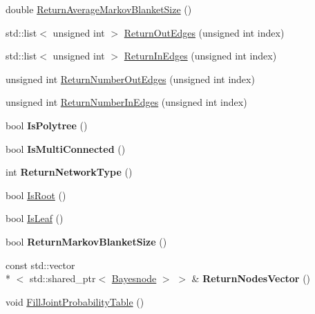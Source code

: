 \begin{DoxyCompactItemize}
\item 
double \hyperlink{classbayonet_1_1_bayesnet_aff74bb04d80a706595705bfa7b58758c}{Return\-Average\-Markov\-Blanket\-Size} ()
\item 
std\-::list$<$ unsigned int $>$ \hyperlink{classbayonet_1_1_bayesnet_acb33076271f03ba59ac98a04b762d26b}{Return\-Out\-Edges} (unsigned int index)
\item 
std\-::list$<$ unsigned int $>$ \hyperlink{classbayonet_1_1_bayesnet_a5621b949d8fda17ae0efd9810655b1b3}{Return\-In\-Edges} (unsigned int index)
\item 
unsigned int \hyperlink{classbayonet_1_1_bayesnet_aae9de07f181dc75f309b7f59e302a947}{Return\-Number\-Out\-Edges} (unsigned int index)
\item 
unsigned int \hyperlink{classbayonet_1_1_bayesnet_a7d47ce38f3882b80121f6acc351fd373}{Return\-Number\-In\-Edges} (unsigned int index)
\item 
\hypertarget{classbayonet_1_1_bayesnet_adb81cc447fe07fab5652c7a6b2fe9375}{bool {\bfseries Is\-Polytree} ()}\label{classbayonet_1_1_bayesnet_adb81cc447fe07fab5652c7a6b2fe9375}

\item 
\hypertarget{classbayonet_1_1_bayesnet_af82ed68cc718009c948d681addd48e23}{bool {\bfseries Is\-Multi\-Connected} ()}\label{classbayonet_1_1_bayesnet_af82ed68cc718009c948d681addd48e23}

\item 
\hypertarget{classbayonet_1_1_bayesnet_a6a3fa624a2e63c642112e80f6683edc5}{int {\bfseries Return\-Network\-Type} ()}\label{classbayonet_1_1_bayesnet_a6a3fa624a2e63c642112e80f6683edc5}

\item 
bool \hyperlink{classbayonet_1_1_bayesnet_a232ae71328a563673061e500cfc2e438}{Is\-Root} ()
\item 
bool \hyperlink{classbayonet_1_1_bayesnet_a5fbfbed5794f03fe64f447cba2a27759}{Is\-Leaf} ()
\item 
\hypertarget{classbayonet_1_1_bayesnet_a7e044272b57dc77e11ab0646460aa142}{bool {\bfseries Return\-Markov\-Blanket\-Size} ()}\label{classbayonet_1_1_bayesnet_a7e044272b57dc77e11ab0646460aa142}

\item 
\hypertarget{classbayonet_1_1_bayesnet_ab0e31b9a2b625b5b59d3e70e3c7e4101}{const std\-::vector\\*
$<$ std\-::shared\-\_\-ptr$<$ \hyperlink{classbayonet_1_1_bayesnode}{Bayesnode} $>$ $>$ \& {\bfseries Return\-Nodes\-Vector} ()}\label{classbayonet_1_1_bayesnet_ab0e31b9a2b625b5b59d3e70e3c7e4101}

\item 
void \hyperlink{classbayonet_1_1_bayesnet_a586e4951a91ac2c47d8448caea25d657}{Fill\-Joint\-Probability\-Table} ()
\end{DoxyCompactItemize}
